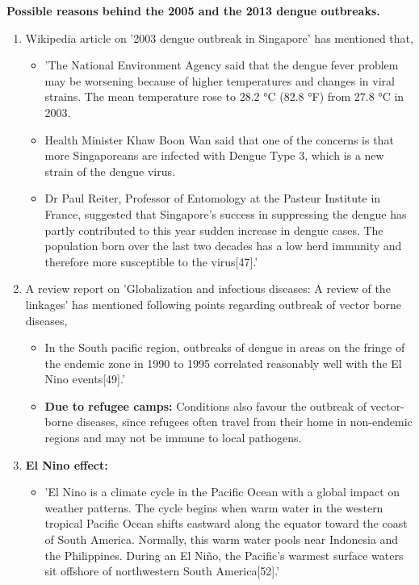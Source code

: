 \documentclass[11pt]{exam}
\begin{document}
\begin{questions}
\newpage
\textbf{Possible reasons behind the 2005 and the 2013 dengue outbreaks.}
\begin{enumerate}
\item Wikipedia article on '2003 dengue outbreak in Singapore' has mentioned that,
\begin{itemize}
\item 'The National Environment Agency said that the dengue fever problem may be worsening because of higher temperatures and changes in viral strains. The mean temperature rose to 28.2 °C (82.8 °F) from 27.8 °C in 2003. 
\item Health Minister Khaw Boon Wan said that one of the concerns is that more Singaporeans are infected with Dengue Type 3, which is a new strain of the dengue virus.
\item Dr Paul Reiter, Professor of Entomology at the Pasteur Institute in France, suggested that Singapore's success in suppressing the dengue has partly contributed to this year sudden increase in dengue cases. The population born over the last two decades has a low herd immunity and therefore more susceptible to the virus[47].'
\end{itemize}
\item A review report on 'Globalization and infectious diseases: A review of the linkages' has mentioned following points regarding outbreak of vector borne diseases,
\begin{itemize}
\item In the South pacific region, outbreaks of dengue in areas on the fringe of the endemic zone in 1990 to 1995 correlated reasonably well with the El Nino events[49].'
\item \textbf{Due to refugee camps:} Conditions also favour the outbreak of vector-borne diseases, since refugees often travel from their home in non-endemic regions and may not be immune to local pathogens.
\end{itemize} 
\item \textbf{El Nino effect:}
\begin{itemize}
\item 'El Nino is a climate cycle in the Pacific Ocean with a global impact on weather patterns. The cycle begins when warm water in the western tropical Pacific Ocean shifts eastward along the equator toward the coast of South America. Normally, this warm water pools near Indonesia and the Philippines. During an El Niño, the Pacific's warmest surface waters sit offshore of northwestern South America[52].' \\

\end{itemize}
\end{enumerate}
\end{questions}
\end{document}
